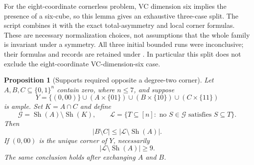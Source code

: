 \documentclass[11pt]{article}
\numberwithin{equation}{section}
\newtheorem{proposition}[theorem]{Proposition}
\theoremstyle{definition}
\theoremstyle{remark}
\begin{document}
For the eight-coordinate cornerless problem, VC dimension six implies
the presence of a six-cube, so this lemma gives an exhaustive three-case
split. The script 
combines it with the exact total-asymmetry and local corner formulas.
These are necessary normalization choices, not assumptions that the
whole family is invariant under a symmetry. All three initial bounded
runs were inconclusive; their formulas and records are retained under
. In particular this split does
not exclude the eight-coordinate VC-dimension-six case.

\begin{proposition}[Supports required opposite a degree-two corner]
\label{prop:square-opposite-support-bound}
Let $A,B,C\subseteq\{0,1\}^n$ contain zero, where $n\le7$, and suppose
\[
 Y=\{(0,00)\}\cup(A\times\{01\})\cup(B\times\{10\})
       \cup(C\times\{11\})
\]
is ample. Set $K=A\cap C$ and define
\[
 \mathcal G=\operatorname{Sh}(A)\setminus\operatorname{Sh}(K),
 \qquad
 \mathcal L=\{T\subseteq[n]:\text{ no }S\in\mathcal G
                                      \text{ satisfies }S\subseteq T\}.
\]
Then
\[
 |B\setminus C|\le |\mathcal L\setminus\operatorname{Sh}(A)|.
\]
If $(0,00)$ is the unique corner of $Y$, necessarily
\[
 |\mathcal L\setminus\operatorname{Sh}(A)|\ge9.
\]
The same conclusion holds after exchanging $A$ and $B$.
\end{proposition}
\end{document}
